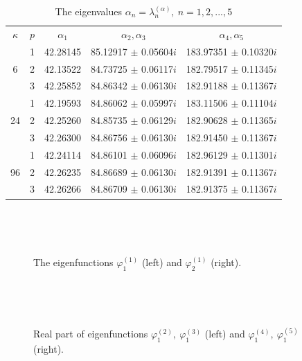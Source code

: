 \documentclass[authoryear]{elsarticle}
\begin{document}
\begin{table}[h]
\caption{The eigenvalues $\alpha_n = \lambda_n^{(\alpha )}, \ n = 1,2, ..., 5$}
\label{t-7}
\begin{center}
\begin{tabular}{ccccc}
\rowcolor{col1}
$\kappa$ & $p$ & $\alpha_1$ &  $\alpha_2, \alpha_3$ &  $\alpha_4, \alpha_5$ \\ 
\rowcolor{col3}
   & 1 & 42.28145 & 85.12917 $\pm$ 0.05604$i$ & 183.97351 $\pm$ 0.10320$i$  \\
\rowcolor{col2}
6  & 2 & 42.13522 & 84.73725 $\pm$ 0.06117$i$  & 182.79517 $\pm$ 0.11345$i$  \\
\rowcolor{col1}
   & 3 & 42.25852 & 84.86342 $\pm$ 0.06130$i$  & 182.91188 $\pm$ 0.11367$i$  \\
\rowcolor{col3}
   & 1 & 42.19593 & 84.86062 $\pm$ 0.05997$i$  & 183.11506 $\pm$ 0.11104$i$  \\
\rowcolor{col2}
24 & 2 & 42.25260 & 84.85735 $\pm$ 0.06129$i$  & 182.90628 $\pm$ 0.11365$i$  \\
\rowcolor{col1}
   & 3 & 42.26300 & 84.86756 $\pm$ 0.06130$i$  & 182.91450 $\pm$ 0.11367$i$  \\
\rowcolor{col3}
   & 1 & 42.24114 & 84.86101 $\pm$ 0.06096$i$  & 182.96129 $\pm$ 0.11301$i$  \\
\rowcolor{col2}
96 & 2 & 42.26235 & 84.86689 $\pm$ 0.06130$i$  & 182.91391 $\pm$ 0.11367$i$  \\
\rowcolor{col1}
   & 3 & 42.26266 & 84.86709 $\pm$ 0.06130$i$  & 182.91375 $\pm$ 0.11367$i$  \\
\end{tabular}
\end{center}
\end{table}
\begin{figure}[!h]
  \begin{center}
\begin{minipage}{0.49\linewidth}
 \\
\end{minipage}
\hfill
\begin{minipage}{0.49\linewidth}
 \\
\end{minipage}
\caption{The eigenfunctions $\varphi^{(1)}_1$ (left) and $\varphi^{(1)}_2$ (right).}
\label{fig:17}
  \end{center}
\end{figure}
\begin{figure}[!h]
  \begin{center}
\begin{minipage}{0.49\linewidth}
 \\
\end{minipage}
\hfill
\begin{minipage}{0.49\linewidth}
 \\
\end{minipage}
\caption{Real part of eigenfunctions $\varphi^{(2)}_1, \ \varphi^{(3)}_1$ (left) and $\varphi^{(4)}_1, \ \varphi^{(5)}_1$ (right).}
\label{fig:18}
  \end{center}
\end{figure}
\end{document}

